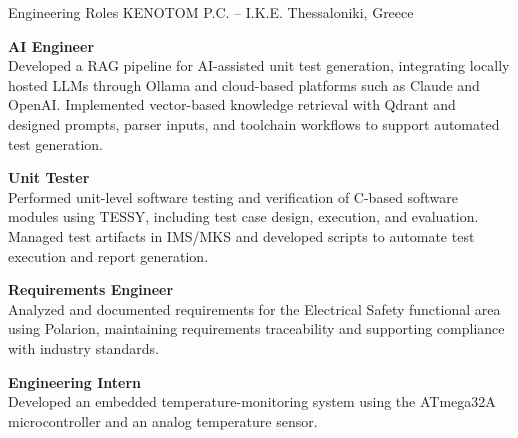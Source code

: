 
\begin{cventries}

  \cventry
    {Engineering Roles}
    {KENOTOM P.C. -- I.K.E.}
    {Thessaloniki, Greece}
    {}
    {
      \begin{cvitems}
        \item \textbf{AI Engineer}\hfill{}\\
        Developed a RAG pipeline for AI-assisted unit test generation, integrating locally hosted LLMs through Ollama and cloud-based platforms such as Claude and OpenAI. Implemented vector-based knowledge retrieval with Qdrant and designed prompts, parser inputs, and toolchain workflows to support automated test generation.
        \item \textbf{Unit Tester}\hfill{}\\
        Performed unit-level software testing and verification of C-based software modules using TESSY, including test case design, execution, and evaluation. Managed test artifacts in IMS/MKS and developed scripts to automate test execution and report generation.
        \item \textbf{Requirements Engineer}\hfill{}\\
        Analyzed and documented requirements for the Electrical Safety functional area using Polarion, maintaining requirements traceability and supporting compliance with industry standards.
        \item \textbf{Engineering Intern}\hfill{}\\
        Developed an embedded temperature-monitoring system using the ATmega32A microcontroller and an analog temperature sensor.
      \end{cvitems}
    }

\end{cventries}
